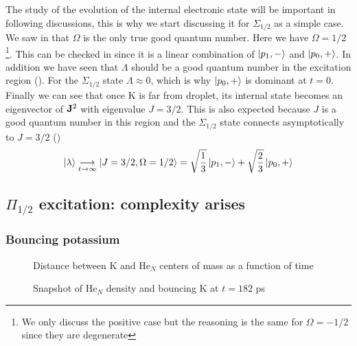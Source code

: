 The study of the evolution of the internal electronic state will be important in following discussions, this is why we start discussing it for $\Sigma_{1/2}$ as a simple case. 
We saw in  that $\Omega$ is the only true good quantum number.
Here we have $\Omega=1/2$\footnote{We only discuss the positive case but the reasoning is the same for $\Omega=-1/2$ since they are degenerate}.
This can be checked in  since it is a linear combination of $\ket{p_1,-}$ and $\ket{p_0,+}$.
In addition we have seen that $\Lambda$ should be a good quantum number in the excitation region ().
For the  $\Sigma_{1/2}$  state $\Lambda\approx 0$, which is why $\ket{p_0,+}$ is dominant at $t=0$.
Finally we can see that once K is far from droplet, its internal state becomes an eigenvector of $\vb{J}^2$ with eigenvalue $J=3/2$.
This is also expected because $J$ is a good quantum number in this region and the  $\Sigma_{1/2}$ state connects asymptotically to $J=3/2$  ()
\begin{align}
\ket{\lambda} \underset{t\rightarrow \infty}{\longrightarrow} \ket{J=3/2,\Omega=1/2} = \sqrt{\frac{1}{3}} \ket{p_1,-} + \sqrt{\frac{2}{3}} \ket{p_0,+}
\end{align}

\subsection{$\Pi_{1/2}$ excitation: complexity arises}

\subsubsection{Bouncing potassium}

\begin{figure}[h!]
	\centering
	\begin{minipage}[c]{0.48\linewidth}
		
		\vspace{0.2\baselineskip}
		\caption{Distance between K and He$_N$ centers of mass as a function of time\label{fig:4P-p12-n-pos}}
	\end{minipage}
\hfill
	\begin{minipage}[c]{0.48\linewidth}
		\caption{Snapshot of He$_N$ density and bouncing K at $t=182$ ps \label{fig:4P-p12-n-snap}}
	\end{minipage}
\end{figure}

